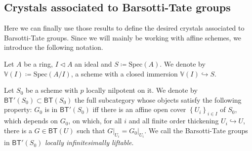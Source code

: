 \documentclass[../Main]{subfiles}
\begin{document}
\subsection{Crystals associated to Barsotti-Tate groups}
Here we can finally use those results to define the desired crystals
associated to Barsotti-Tate groups.
Since we will mainly be working with affine schemes,
we introduce the following notation.


\begin{ntt}
	Let $A$ be a ring, $I \triangleleft A$ an ideal and $S \coloneqq \mathrm{Spec}(A)$.
	We denote by $\mathbb{V}(I) \coloneqq \mathrm{Spec}(A/I)$,
	a scheme with a closed immersion $\mathbb{V}(I) \hookrightarrow S$.
\end{ntt} 


\begin{defn}
	Let $S_0$ be a scheme with $p$ locally nilpotent on it.
	We denote by $\mathsf{BT}'(S_0) \subset \mathsf{BT}(S_0)$ 
	the full subcategory whose objects satisfy the following property:
	$G_0$ is in $\mathsf{BT}'(S_0)$ iff
	there is an affine open cover $\left\{ U_i \right\}_{i \in I}$ of $S_0$, which depends on $G_0$, 
	on which, for all $i$ and all finite order thickening $U_i \hookrightarrow U$,
	there is a $G \in \mathsf{BT}(U)$ such that
	$\left.G\right|_{U_i} = \left.G_0\right|_{U_i}$.
	We call the Barsotti-Tate groups in $\mathsf{BT}'(S_0)$
	{\em locally infinitesimally liftable}.
\end{defn}
\end{document}
